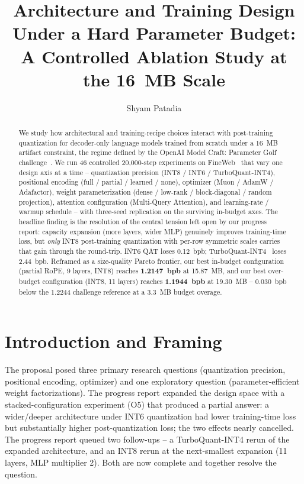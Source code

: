 \documentclass[sigconf,nonacm,natbib=false]{acmart}
\title{Architecture and Training Design Under a Hard Parameter Budget:
A Controlled Ablation Study at the 16~MB Scale}
\author{Shyam Patadia}
\affiliation{%
  \institution{Worcester Polytechnic Institute}
  \city{Worcester}
  \state{MA}
  \country{USA}}
\renewcommand{\_}{\discretionary{\char`\_}{}{\char`\_}}
\begin{document}
\begin{abstract}
We study how architectural and training-recipe choices interact with
post-training quantization for decoder-only language models trained
from scratch under a 16~MB artifact constraint, the regime defined by
the OpenAI Model Craft: Parameter Golf
challenge~\cite{paramgolf2026}. We run 46 controlled 20{,}000-step
experiments on FineWeb~\cite{fineweb2024} that vary one design axis at
a time -- quantization precision (INT8 / INT6 / TurboQuant-INT4),
positional encoding (full / partial / learned / none), optimizer
(Muon / AdamW / Adafactor), weight parameterization (dense / low-rank /
block-diagonal / random projection), attention configuration
(Multi-Query Attention), and learning-rate / warmup schedule -- with
three-seed replication on the surviving in-budget axes.
The headline finding is the resolution of the central tension left
open by our progress report: capacity expansion (more layers, wider
MLP) genuinely improves training-time loss, but \emph{only} INT8
post-training quantization with per-row symmetric scales carries that
gain through the round-trip. INT6 QAT loses 0.12~bpb;
TurboQuant-INT4~\cite{turboquant2024} loses 2.44~bpb. Reframed as a
size-quality Pareto frontier, our best in-budget configuration
(partial RoPE, 9 layers, INT8) reaches \textbf{1.2147~bpb} at 15.87~MB,
and our best over-budget configuration (INT8, 11 layers) reaches
\textbf{1.1944~bpb} at 19.30~MB -- 0.030~bpb below the 1.2244 challenge
reference at a 3.3~MB budget overage.
\end{abstract}


\maketitle

\section{Introduction and Framing}

The proposal posed three primary research questions (quantization
precision, positional encoding, optimizer) and one exploratory question
(parameter-efficient weight factorizations). The progress report
expanded the design space with a stacked-configuration experiment
(O5) that produced a partial answer: a wider/deeper architecture under
INT6 quantization had lower training-time loss but substantially higher
post-quantization loss; the two effects nearly cancelled. The progress
report queued two follow-ups -- a TurboQuant-INT4 rerun of the expanded
architecture, and an INT8 rerun at the next-smallest expansion (11
layers, MLP multiplier 2). Both are now complete and together resolve
the question.
\end{document}
